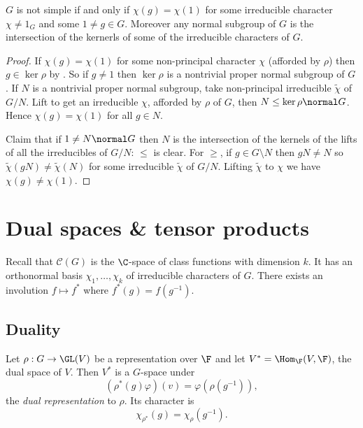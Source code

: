 \documentclass[a4paper]{article}
\begin{document}
\begin{lemma}
  \(G\) is not simple if and only if \(\chi(g) = \chi(1)\) for some irreducible character \(\chi \neq 1_G\) and some \(1 \neq g \in G\). Moreover any normal subgroup of \(G\) is the intersection of the kernerls of some of the irreducible characters of \(G\).
\end{lemma}

\begin{proof}
  If \(\chi(g) = \chi(1)\) for some non-principal character \(\chi\) (afforded by \(\rho\)) then \(g \in \ker \rho\) by . So if \(g \neq 1\) then \(\ker \rho\) is a nontrivial proper normal subgroup of \(G\). If \(N\) is a nontrivial proper normal subgroup, take non-principal irreducible \(\tilde \chi\) of \(G/N\). Lift to get an irreducible \(\chi\), afforded by \(\rho\) of \(G\), then \(N \leq \ker \rho \normal G\). Hence \(\chi(g) = \chi(1)\) for all \(g \in N\).

  Claim that if \(1 \neq N \normal G\) then \(N\) is the intersection of the kernels of the lifts of all the irreducibles of \(G/N\): \(\leq\) is clear. For \(\geq\), if \(g \in G \setminus N\) then \(gN \neq N\) so \(\tilde \chi(gN) \neq \tilde \chi(N)\) for some irreducible \(\tilde \chi\) of \(G/N\). Lifting \(\tilde \chi\) to \(\chi\) we have \(\chi(g) \neq \chi(1)\).
\end{proof}

\section{Dual spaces \& tensor products}

Recall that \(\mathcal C(G)\) is the \(\C\)-space of class functions with dimension \(k\). It has an orthonormal basis \(\chi_1, \dots, \chi_k\) of irreducible characters of \(G\). There exists an involution \(f \mapsto f^*\) where \(f^*(g) = f(g^{-1})\).

\subsection{Duality}

\begin{lemma}
  Let \(\rho: G \to \GL(V)\) be a representation over \(\F\) and let \(V^* = \Hom_\F(V, \F)\), the dual space of \(V\). Then \(V^*\) is a \(G\)-space under
  \[
    (\rho^*(g)\varphi)(v) = \varphi(\rho(g^{-1})),
  \]
  the \emph{dual representation} to \(\rho\). Its character is
  \[
    \chi_{\rho^*}(g) = \chi_\rho(g^{-1}).
  \]
\end{lemma}
\end{document}
